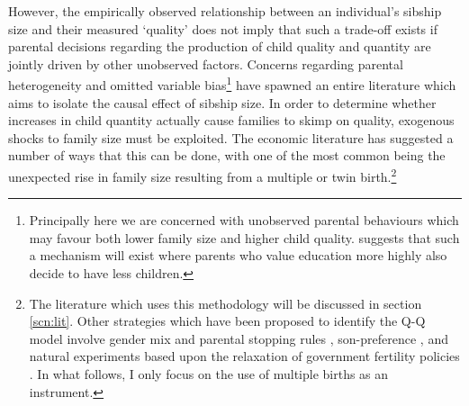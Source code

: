 \documentclass{article}[11pt,subeqn]
\begin{document}
\begin{spacing}{1.5}
However, the empirically observed relationship between an individual's sibship size and their measured `quality' does not imply that such a trade-off exists if parental decisions 
regarding the production of child quality and quantity are jointly driven by other unobserved factors.  Concerns regarding parental heterogeneity and omitted variable 
bias\footnote{Principally here we are concerned with unobserved parental behaviours which may favour both lower family size and higher child quality.  \citet{Qian2009} 
suggests that such a mechanism will exist where parents who value education more highly also decide to have less children.} have spawned an entire literature which aims to 
isolate the causal effect of sibship size.  In order to determine whether increases in child quantity actually cause families to skimp on quality, exogenous shocks to family 
size must be exploited.  The economic literature has suggested a number of ways that this can be done, with one of the most common being the unexpected rise in family size 
resulting from a multiple or twin birth.\footnote{The literature which uses this methodology will be discussed in section \ref{scn:lit}.  Other strategies which have been proposed 
to identify the Q-Q model involve gender mix and parental stopping rules \citep{ConleyGlauber2006}, son-preference \citep{Lee2008}, and natural experiments based upon the 
relaxation of government fertility policies \citep{Qian2009}.   In what follows, I only focus on the use of multiple births as an instrument.}


\end{spacing}
\end{document}
